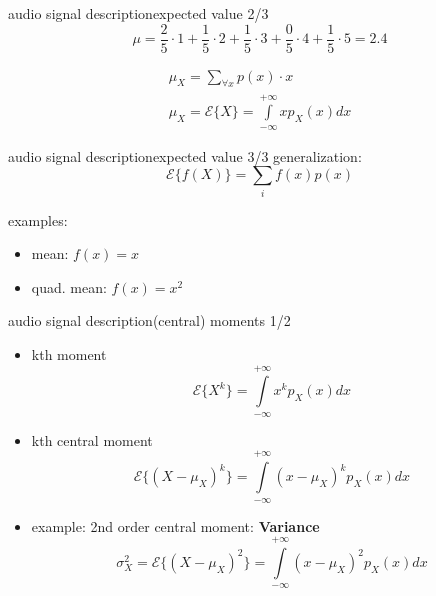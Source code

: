 \begin{frame}{audio signal description}{expected value 2/3}
	\begin{equation}
		\mu = \frac{2}{5}\cdot 1 + \frac{1}{5}\cdot 2 + \frac{1}{5}\cdot 3 + \frac{0}{5}\cdot 4 + \frac{1}{5}\cdot 5  = 2.4
	\end{equation}
	
	\pause
	\begin{eqnarray}
		\mu_X 	= \sum\limits_{\forall x} p(x)\cdot x\\
		\mu_X=\mathcal{E}\lbrace   X\rbrace  =\int\limits_{-\infty}^{+\infty}xp_X(x)dx
	\end{eqnarray}
\end{frame}		
\begin{frame}{audio signal description}{expected value 3/3}
	generalization:
	\begin{equation}
		\mathcal{E}\lbrace   f(X)\rbrace  = \sum\limits_i f(x)p(x)
	\end{equation}

	\pause
	examples:
	\begin{itemize}
		\item	mean: $f(x) = x$
		\item	quad. mean: $f(x) = x^2$
	\end{itemize}
\end{frame}		

\begin{frame}{audio signal description}{(central) moments 1/2}
	\begin{itemize}
		\item	kth moment
			\begin{equation}
				\mathcal{E}\lbrace  X^k\rbrace  = \int\limits_{-\infty}^{+\infty}x^kp_X(x)dx
			\end{equation}
		\pause
		\item kth central moment
			\begin{equation}
				\mathcal{E}\lbrace  (X-\mu_X)^k\rbrace  = \int\limits_{-\infty}^{+\infty}(x-\mu_X)^k p_X(x)dx
			\end{equation}

		\pause
		\item	example: 2nd order central moment: \textbf{Variance}
			\begin{equation}
				\sigma_X^2 = \mathcal{E}\lbrace  (X-\mu_X)^2\rbrace  = \int\limits_{-\infty}^{+\infty}(x-\mu_X)^2 p_X(x)dx
			\end{equation}
	\end{itemize}
\end{frame}		

